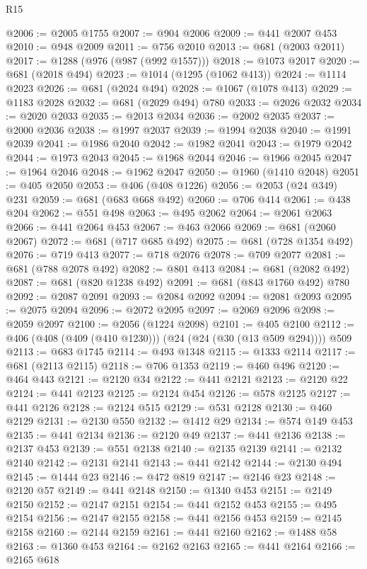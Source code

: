 \begin{lexlean}{R15}
\begin{coremodule}
@2006 := @2005 @1755
@2007 := @904 @2006
@2009 := @441 @2007 @453
@2010 := @948 @2009
@2011 := @756 @2010
@2013 := @681 (@2003 @2011)
@2017 := @1288 (@976 (@987 (@992 @1557)))
@2018 := @1073 @2017
@2020 := @681 (@2018 @494)
@2023 := @1014 (@1295 (@1062 @413))
@2024 := @1114 @2023
@2026 := @681 (@2024 @494)
@2028 := @1067 (@1078 @413)
@2029 := @1183 @2028
@2032 := @681 (@2029 @494) @780
@2033 := @2026 @2032
@2034 := @2020 @2033
@2035 := @2013 @2034
@2036 := @2002 @2035
@2037 := @2000 @2036
@2038 := @1997 @2037
@2039 := @1994 @2038
@2040 := @1991 @2039
@2041 := @1986 @2040
@2042 := @1982 @2041
@2043 := @1979 @2042
@2044 := @1973 @2043
@2045 := @1968 @2044
@2046 := @1966 @2045
@2047 := @1964 @2046
@2048 := @1962 @2047
@2050 := @1960 (@1410 @2048)
@2051 := @405 @2050
@2053 := @406 (@408 @1226)
@2056 := @2053 (@24 @349) @231
@2059 := @681 (@683 @668 @492)
@2060 := @706 @414
@2061 := @438 @204
@2062 := @551 @498
@2063 := @495 @2062
@2064 := @2061 @2063
@2066 := @441 @2064 @453
@2067 := @463 @2066
@2069 := @681 (@2060 @2067)
@2072 := @681 (@717 @685 @492)
@2075 := @681 (@728 @1354 @492)
@2076 := @719 @413
@2077 := @718 @2076
@2078 := @709 @2077
@2081 := @681 (@788 @2078 @492)
@2082 := @801 @413
@2084 := @681 (@2082 @492)
@2087 := @681 (@820 @1238 @492)
@2091 := @681 (@843 @1760 @492) @780
@2092 := @2087 @2091
@2093 := @2084 @2092
@2094 := @2081 @2093
@2095 := @2075 @2094
@2096 := @2072 @2095
@2097 := @2069 @2096
@2098 := @2059 @2097
@2100 := @2056 (@1224 @2098)
@2101 := @405 @2100
@2112 := @406 (@408 (@409 (@410 @1230))) (@24 (@24 (@30 (@13 @509 @294)))) @509
@2113 := @683 @1745
@2114 := @493 @1348
@2115 := @1333 @2114
@2117 := @681 (@2113 @2115)
@2118 := @706 @1353
@2119 := @460 @496
@2120 := @464 @443
@2121 := @2120 @34
@2122 := @441 @2121
@2123 := @2120 @22
@2124 := @441 @2123
@2125 := @2124 @454
@2126 := @578 @2125
@2127 := @441 @2126
@2128 := @2124 @515
@2129 := @531 @2128
@2130 := @460 @2129
@2131 := @2130 @550
@2132 := @1412 @29
@2134 := @574 @149 @453
@2135 := @441 @2134
@2136 := @2120 @49
@2137 := @441 @2136
@2138 := @2137 @453
@2139 := @551 @2138
@2140 := @2135 @2139
@2141 := @2132 @2140
@2142 := @2131 @2141
@2143 := @441 @2142
@2144 := @2130 @494
@2145 := @1444 @23
@2146 := @472 @819
@2147 := @2146 @23
@2148 := @2120 @57
@2149 := @441 @2148
@2150 := @1340 @453
@2151 := @2149 @2150
@2152 := @2147 @2151
@2154 := @441 @2152 @453
@2155 := @495 @2154
@2156 := @2147 @2155
@2158 := @441 @2156 @453
@2159 := @2145 @2158
@2160 := @2144 @2159
@2161 := @441 @2160
@2162 := @1488 @58
@2163 := @1360 @453
@2164 := @2162 @2163
@2165 := @441 @2164
@2166 := @2165 @618

\end{coremodule}
\end{lexlean}
